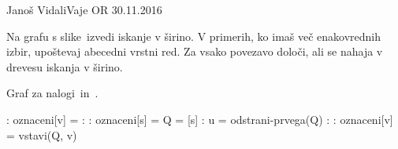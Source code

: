 
\begin{naloga}{Janoš Vidali}{Vaje OR 30.11.2016}
\begin{vprasanje}
Na grafu s slike~\fig izvedi iskanje v širino.
V primerih, ko imaš več ena\-ko\-vred\-nih izbir,
upoštevaj abecedni vrstni red.
Za vsako povezavo določi, ali se nahaja v drevesu iskanja v širino.

\begin{slika}
\pgfslika
\caption{Graf za nalogi~\nal in~\nal[dfs].}
\end{slika}
\end{vprasanje}

\begin{odgovor}

\begin{small}
\begin{algorithmic}
	:
		\State oznaceni[v] = \False
	\EndFor
	:
		:
			\State oznaceni[s] = \True
			\State Q = [s]
			:
				\State u = odstrani-prvega(Q)
				:
					:
						\State oznaceni[v] = \True
						\State vstavi(Q, v)
					\EndIf
				\EndFor
			\EndWhile
		\EndIf
	\EndFor
		

\end{algorithmic}
\end{small}
\end{odgovor}
\end{naloga}
